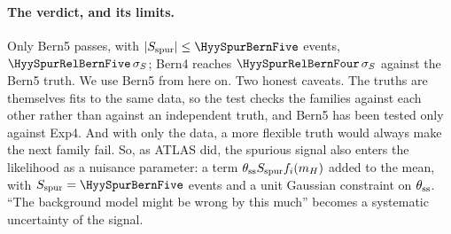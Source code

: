 \paragraph{The verdict, and its limits.}
Only Bern5 passes, with $|S_{\rm spur}|\le\HyySpurBernFive$ events,
$\HyySpurRelBernFive\,\sigma_S$; Bern4 reaches $\HyySpurRelBernFour\,\sigma_S$ against the
Bern5 truth. We use Bern5 from here on. Two honest caveats. The truths are themselves fits
to the same data, so the test checks the families against each other rather than against
an independent truth, and Bern5 has been tested only against Exp4. And with only the data,
a more flexible truth would always make the next family fail. So, as ATLAS did, the
spurious signal also enters the likelihood as a nuisance parameter: a term
$\theta_{\rm ss}S_{\rm spur}f_i(m_H)$ added to the mean, with $S_{\rm spur}=\HyySpurBernFive$
events and a unit Gaussian constraint on $\theta_{\rm ss}$. ``The background model might be
wrong by this much'' becomes a systematic uncertainty of the signal.


